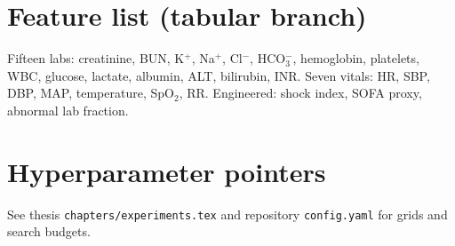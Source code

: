 \section{Feature list (tabular branch)}
\label{app:feats}
Fifteen labs: creatinine, BUN, K$^+$, Na$^+$, Cl$^-$, HCO$_3^-$, hemoglobin, platelets, WBC, glucose, lactate, albumin, ALT, bilirubin, INR. Seven vitals: HR, SBP, DBP, MAP, temperature, SpO$_2$, RR. Engineered: shock index, SOFA proxy, abnormal lab fraction.

\section{Hyperparameter pointers}
See thesis \texttt{chapters/experiments.tex} and repository \texttt{config.yaml} for grids and search budgets.
